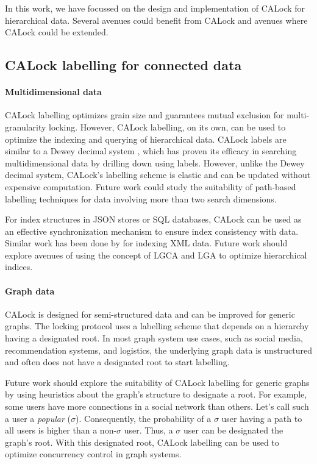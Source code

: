 In this work, we have focussed on the design and implementation of CALock for hierarchical data. Several avenues could benefit from CALock and avenues where CALock could be extended.

\subsection{CALock labelling for connected data}

\paragraph{Multidimensional data}

CALock labelling optimizes grain size and guarantees mutual exclusion for multi-granularity locking. However, CALock labelling, on its own, can be used to optimize the indexing and querying of hierarchical data. CALock labels are similar to a Dewey decimal system \cite{DBLP:journals/jd/Sweeney83}, which has proven its efficacy in searching multidimensional data by drilling down using labels. However, unlike the Dewey decimal system, CALock's labelling scheme is elastic and can be updated without expensive computation. Future work could study the suitability of path-based labelling techniques for data involving more than two search dimensions. 

For index structures in JSON stores or SQL databases, CALock can be used as an effective synchronization mechanism to ensure index consistency with data. Similar work has been done by \citet{DBLP:journals/pvldb/FinisBK0MF15} for indexing XML data. Future work should explore avenues of using the concept of LGCA and LGA to optimize hierarchical indices. 

\paragraph{Graph data}

CALock is designed for semi-structured data and can be improved for generic graphs. The locking protocol uses a labelling scheme that depends on a hierarchy having a designated root. In most graph system use cases, such as social media, recommendation systems, and logistics, the underlying graph data is unstructured and often does not have a designated root to start labelling. 

Future work should explore the suitability of CALock labelling for generic graphs by using heuristics about the graph's structure to designate a root. For example, some users have more connections in a social network than others. Let's call such a user a \emph{popular} ($\sigma$). Consequently, the probability of a $\sigma$ user having a path to all users is higher than a non-$\sigma$ user. Thus, a $\sigma$ user can be designated the graph's root. With this designated root, CALock labelling can be used to optimize concurrency control in graph systems.

